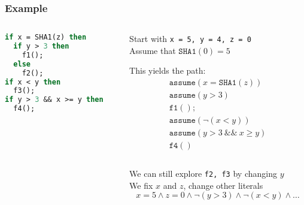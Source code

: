 \documentclass[10pt,xcolor={dvipsnames}]{beamer}
\begin{document}
\begin{frame}[fragile]

\frametitle{Example}

\begin{columns}

\begin{column}{0.4\textwidth}
\begin{lstlisting}[language=Caml]
if x = SHA1(z) then
  if y > 3 then
    f1();
  else
    f2();
if x < y then
  f3();
if y > 3 && x >= y then
  f4();
\end{lstlisting}
\end{column}

\begin{column}{0.6\textwidth}

Start with \texttt{x = 5, y = 4, z = 0}
\\[1em]

Assume that $\mathtt{SHA1}(0) = 5$
\\[1em]
\pause

This yields the path:
\[
\begin{array}{l}
%
\mathtt{assume}(x = \mathtt{SHA1}(z)) \\
\mathtt{assume}(y > 3) \\
\mathtt{f1();} \\
\mathtt{assume}(\lnot(x < y)) \\
\mathtt{assume}(y > 3 \mathtt{\ \&\&\ } x \ge y) \\
\mathtt{f4()} \\
\end{array}
\]
\\[0.5em]

\pause
We can still explore \texttt{f2, f3} by changing $y$
\\[1em]

We fix $x$ and $z$, change other literals
\pause
\[
x = 5 \land z = 0 \land \lnot(y > 3) \land \lnot(x < y) \land \ldots
\]

\end{column}

\end{columns}

\end{frame}

\end{document}
